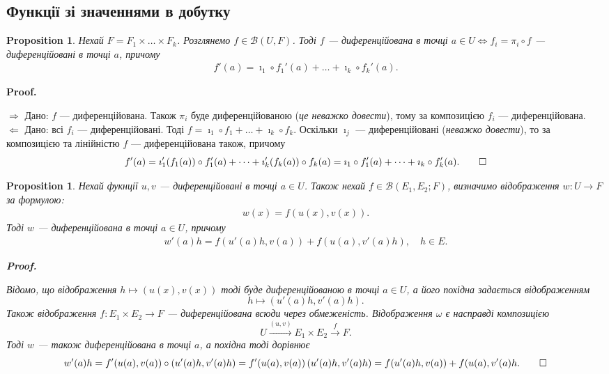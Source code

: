 \documentclass[a4paper, 10pt]{article}
\makeatletter
\def\rightproof{$\boxed{\Rightarrow}$ }
\def\leftproof{$\boxed{\Leftarrow}$ }
\theoremstyle{theoremdd}
\theoremstyle{theoremdd}
\theoremstyle{theoremdd}
\theoremstyle{theoremdd}
\theoremstyle{theoremdd}
\newtheorem{proposition}[theorem]{Proposition}
\theoremstyle{theoremdd}
\theoremstyle{theoremdd}
\theoremstyle{theoremdd}
\renewenvironment{proof}[1][Proof.\\]{\par
\pushQED{\hfill \qed}%
\normalfont \topsep6\p@\@plus6\p@\relax
\trivlist
\item\relax
{\bfseries
#1\@addpunct{.}}\hspace\labelsep\ignorespaces
}{%
\popQED\endtrivlist\@endpefalse
}
\makeatother
\begin{document}
\subsection{Функції зі значеннями в добутку}
\begin{proposition}
Нехай $F = F_1 \times \dots \times F_k$. Розглянемо $f \in \mathcal{B}(U,F)$. Тоді $f$ --- диференційована в точці $a \in U \iff f_i = \pi_i \circ f$ --- диференційовані в точці $a$, причому
\begin{align*}
f'(a) = \imath_1 \circ f_1'(a) + \dots + \imath_k \circ f_k'(a).
\end{align*}
\end{proposition}

\begin{proof}
\rightproof Дано: $f$ --- диференційована. Також $\pi_i$ буде диференційованою (\textit{це неважко довести}), тому за композицією $f_i$ --- диференційована.
\bigskip \\
\leftproof Дано: всі $f_i$ --- диференційовані. Тоді $f = \imath_1 \circ f_1 + \dots + \imath_k \circ f_k$. Оскільки $\imath_j$ --- диференційовані (\textit{неважко довести}), то за композицією та лінійністю $f$ --- диференційована також, причому
\[
f'(a) = \imath_1'(f_1(a)) \circ f_1'(a) + \dots + \imath_k'(f_k(a)) \circ f_k(a) = \imath_1 \circ f_1'(a) + \dots + \imath_k \circ f_k'(a). \qedhere
\]
\end{proof}

\begin{proposition}
Нехай фукнції $u,v$ --- диференційовані в точці $a \in U$. Також нехай $f \in \mathcal{B}(E_1,E_2;F)$, визначимо відображення $w \colon U \to F$ за формулою:
\begin{align*}
w(x) = f(u(x),v(x)).
\end{align*}
Тоді $w$ --- диференційована в точці $a \in U$, причому
\begin{align*}
w'(a) h = f(u'(a) h, v(a)) + f(u(a), v'(a)h),\quad h \in E.
\end{align*}

\begin{proof}
Відомо, що відображення $h \mapsto (u(x),v(x))$ тоді буде диференційованою в точці $a \in U$, а його похідна задається відображенням
\[
h \mapsto (u'(a)h, v'(a)h).
\]
Також відображення $f \colon E_1 \times E_2 \to F$ --- диференційована всюди через обмеженість. Відображення $\omega$ є насправді композицією
\[
U \overset{(u,v)}{\to} E_1 \times E_2 \overset{f}{\to} F.
\]
Тоді $w$ --- також диференційована в точці $a$, а похідна тоді дорівнює
\[
w'(a)h = f'(u(a),v(a)) \circ (u'(a)h,v'(a)h) = f'(u(a),v(a))\, (u'(a)h, v'(a)h) = f(u'(a)h, v(a)) + f(u(a), v'(a)h. \qedhere
\]
\end{proof}
\end{proposition}
\end{document}
